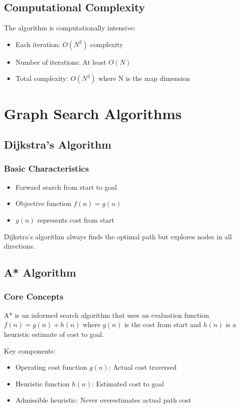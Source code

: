 \documentclass[openany]{book}
\theoremstyle{definition}
\theoremstyle{remark}
\newcommand{\definitionbox}[1]{
\begin{tcolorbox}[colback=blue!5,colframe=blue!40!black,title=Definition]
 #1
\end{tcolorbox}
}
\newcommand{\note}[1]{
\begin{tcolorbox}[colback=green!5,colframe=green!40!black,title=Note]
 #1
\end{tcolorbox}
}
\begin{document}
\subsection{Computational Complexity}
The algorithm is computationally intensive:
\begin{itemize}
    \item Each iteration: $O(N^2)$ complexity
    \item Number of iterations: At least $O(N)$
    \item Total complexity: $O(N^3)$ where N is the map dimension
\end{itemize}

\section{Graph Search Algorithms}

\subsection{Dijkstra's Algorithm}

\subsubsection{Basic Characteristics}
\begin{itemize}
    \item Forward search from start to goal
    \item Objective function $f(n) = g(n)$
    \item $g(n)$ represents cost from start
\end{itemize}

\note{Dijkstra's algorithm always finds the optimal path but explores nodes in all directions.}

\subsection{A* Algorithm}

\subsubsection{Core Concepts}
\definitionbox{A* is an informed search algorithm that uses an evaluation function $f(n) = g(n) + h(n)$ where $g(n)$ is the cost from start and $h(n)$ is a heuristic estimate of cost to goal.}

Key components:
\begin{itemize}
    \item Operating cost function $g(n)$: Actual cost traversed
    \item Heuristic function $h(n)$: Estimated cost to goal
    \item Admissible heuristic: Never overestimates actual path cost
\end{itemize}
\end{document}
